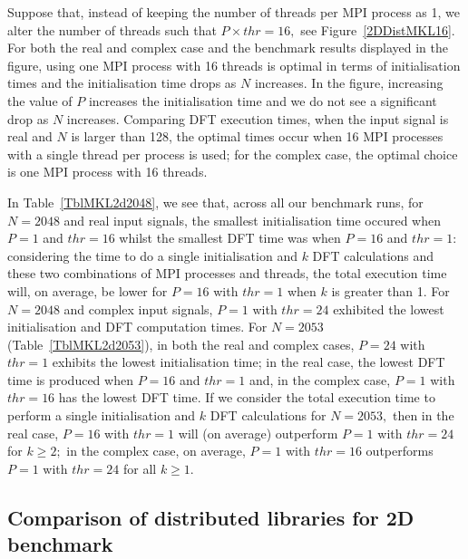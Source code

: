 \documentclass[a4paper]{article}
\begin{document}
Suppose that, instead of keeping the number of threads per MPI process
as 1, we alter the number of threads such that $P\times thr=16,$ see
Figure~\ref{2DDistMKL16}. For both the real and complex case and the
benchmark results displayed in the figure, using one MPI process with
16 threads is optimal in terms of initialisation times and the
initialisation time drops as $N$ increases. In the figure, increasing
the value of $P$ increases the initialisation time and we do not see a
significant drop as $N$ increases.  Comparing DFT execution times,
when the input signal is real and $N$ is larger than 128, the optimal
times occur when 16 MPI processes with a single thread per process is
used; for the complex case, the optimal choice is one MPI process with
16 threads.





In Table~\ref{TblMKL2d2048}, we see that, across all our benchmark
runs, for $N=2048$ and real input signals, the smallest initialisation
time occured when $P=1$ and $thr=16$ whilst the smallest DFT time was
when $P=16$ and $thr=1:$ considering the time to do a single
initialisation and $k$ DFT calculations and these two combinations of
MPI processes and threads, the total execution time will, on average,
be lower for $P=16$ with $thr=1$ when $k$ is greater than 1.
For
$N=2048$ and complex input signals, $P=1$ with $thr=24$ exhibited the
lowest initialisation and DFT computation times. For $N=2053$
(Table~\ref{TblMKL2d2053}), in both the real and complex cases,
$P=24$ with $thr=1$ exhibits the lowest initialisation time; in the
real case, the lowest DFT time is produced when $P=16$ and $thr=1$
and, in the complex case, $P=1$ with $thr=16$ has the lowest DFT
time. If we consider the total execution time to perform a single
initialisation and $k$ DFT calculations for $N=2053,$ then in the real
case, $P=16$ with $thr=1$ will (on average) outperform $P=1$ with
$thr=24$ for $k\ge 2;$ in the complex case, on average, $P=1$ with
$thr=16$ outperforms $P=1$ with $thr=24$ for all $k\ge 1.$









\subsection{Comparison of distributed libraries for 2D benchmark}\label{Sec:2DDistComp}
\end{document}

